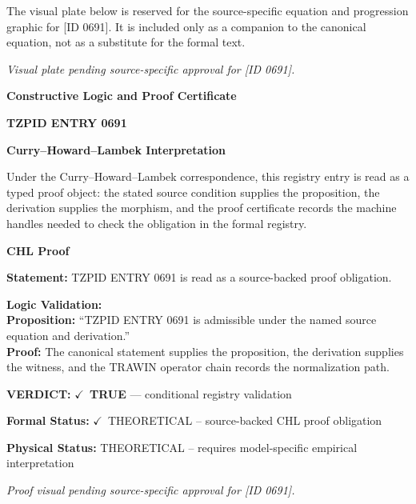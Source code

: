 \begingroup\footnotesize\sloppy
The visual plate below is reserved for the source-specific equation and progression graphic for [ID 0691]. It is included only as a companion to the canonical equation, not as a substitute for the formal text.
\par\endgroup
\begingroup\footnotesize\itshape
Visual plate pending source-specific approval for [ID 0691].
\par\endgroup

\clearpage
\begingroup\tzpsupportsetup
\noindent\textbf{\fontsize{10.8pt}{12.8pt}\selectfont [ID 0691] Constructive Logic and Proof Certificate}\par
\noindent\textbf{\fontsize{10pt}{12pt}\selectfont TZPID ENTRY 0691}\par
\vspace{0.45em}
\begingroup
\footnotesize
\setlength{\parskip}{0.22em}
\setlength{\parindent}{0pt}
\noindent\textbf{Curry--Howard--Lambek Interpretation}\par
Under the Curry--Howard--Lambek correspondence, this registry entry is read as a typed proof
object: the stated source condition supplies the proposition, the derivation supplies the
morphism, and the proof certificate records the machine handles needed to check the obligation
in the formal registry.

\vspace{0.45em}
\noindent\textbf{CHL Proof}\par
\textbf{Statement:} TZPID ENTRY 0691 is read as a source-backed proof obligation.

\textbf{Logic Validation:}\\
\textbf{Proposition:} ``TZPID ENTRY 0691 is admissible under the named source equation and derivation.''\\
\textbf{Proof:} The canonical statement supplies the proposition, the derivation supplies the witness, and the TRAWIN operator chain records the normalization path.

\textbf{VERDICT:} \ensuremath{\checkmark}\ \textbf{TRUE} --- conditional registry validation

\textbf{Formal Status:} \ensuremath{\checkmark}\ THEORETICAL -- source-backed CHL proof obligation

\textbf{Physical Status:} THEORETICAL -- requires model-specific empirical interpretation
\par\vspace{0.45em}
\par
\vfill
\begingroup\footnotesize\itshape
Proof visual pending source-specific approval for [ID 0691].
\par\endgroup
\vfill
\endgroup
\endgroup
